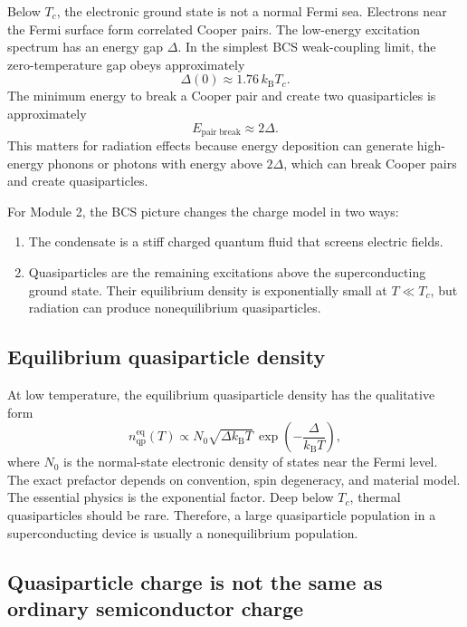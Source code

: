 \documentclass[11pt]{article}
\newcommand{\DeltaSC}{\Delta}
\newcommand{\Tc}{T_{c}}
\begin{document}
Below $\Tc$, the electronic ground state is not a normal Fermi sea. Electrons near the Fermi surface form correlated Cooper pairs. The low-energy excitation spectrum has an energy gap $\DeltaSC$. In the simplest BCS weak-coupling limit, the zero-temperature gap obeys approximately
\begin{equation}
\DeltaSC(0) \approx 1.76\,k_{\mathrm{B}}\Tc.
\end{equation}
The minimum energy to break a Cooper pair and create two quasiparticles is approximately
\begin{equation}
E_{\mathrm{pair\;break}}\approx 2\DeltaSC.
\end{equation}
This matters for radiation effects because energy deposition can generate high-energy phonons or photons with energy above $2\DeltaSC$, which can break Cooper pairs and create quasiparticles.

For Module 2, the BCS picture changes the charge model in two ways:
\begin{enumerate}[leftmargin=2em]
\item The condensate is a stiff charged quantum fluid that screens electric fields.
\item Quasiparticles are the remaining excitations above the superconducting ground state. Their equilibrium density is exponentially small at $T\ll\Tc$, but radiation can produce nonequilibrium quasiparticles.
\end{enumerate}

\subsection{Equilibrium quasiparticle density}

At low temperature, the equilibrium quasiparticle density has the qualitative form
\begin{equation}
 n_{\mathrm{qp}}^{\mathrm{eq}}(T)
 \propto N_0 \sqrt{\DeltaSC k_{\mathrm{B}}T}\,
 \exp\left(-\frac{\DeltaSC}{k_{\mathrm{B}}T}\right),
\label{eq:equilibrium_qp_density}
\end{equation}
where $N_0$ is the normal-state electronic density of states near the Fermi level. The exact prefactor depends on convention, spin degeneracy, and material model. The essential physics is the exponential factor. Deep below $\Tc$, thermal quasiparticles should be rare. Therefore, a large quasiparticle population in a superconducting device is usually a nonequilibrium population.

\subsection{Quasiparticle charge is not the same as ordinary semiconductor charge}
\end{document}
